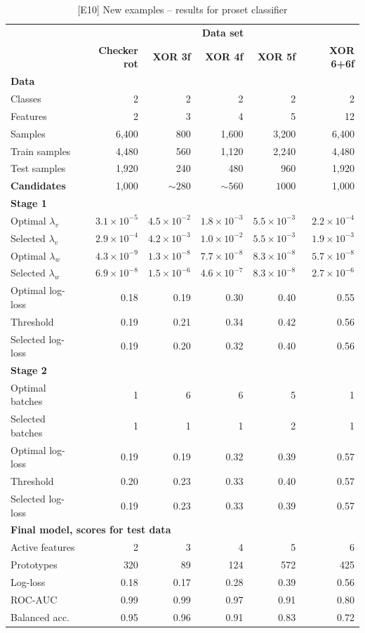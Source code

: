 \begin{table}
\caption{[E10] New examples -- results for proset classifier}
\label{tab_e10}
%
\begin{center}
\small
\begin{tabular}{|lrrrrr|}
\hline
&\multicolumn{5}{c|}{\textbf{\hrulefill\ Data set \hrulefill}}\\
&\textbf{Checker rot}&\textbf{XOR 3f}&\textbf{XOR 4f}&\textbf{XOR 5f}&\textbf{XOR 6+6f}\\
\multicolumn{6}{|l|}{\textbf{Data}}\\
Classes&2&2&2&2&2\\
Features&2&3&4&5&12\\
Samples&6,400&800&1,600&3,200&6,400\\
Train samples&4,480&560&1,120&2,240&4,480\\
Test samples&1,920&240&480&960&1,920\\
\textbf{Candidates}&1,000&$\sim280$&$\sim560$&$1000$&1,000\\
\multicolumn{6}{|l|}{\textbf{Stage 1}}\\
Optimal $\lambda_v$&$3.1\times10^{-5}$&$4.5\times10^{-2}$&$1.8\times10^{-3}$&$5.5\times10^{-3}$&$2.2\times10^{-4}$\\
Selected $\lambda_v$&$2.9\times10^{-4}$&$4.2\times10^{-3}$&$1.0\times10^{-2}$&$5.5\times10^{-3}$&$1.9\times10^{-3}$\\
Optimal $\lambda_w$&$4.3\times10^{-9}$&$1.3\times10^{-8}$&$7.7\times10^{-8}$&$8.3\times10^{-8}$&$5.7\times10^{-8}$\\
Selected $\lambda_w$&$6.9\times10^{-8}$&$1.5\times10^{-6}$&$4.6\times10^{-7}$&$8.3\times10^{-8}$&$2.7\times10^{-6}$\\
Optimal log-loss&0.18&0.19&0.30&0.40&0.55\\
Threshold&0.19&0.21&0.34&0.42&0.56\\
Selected log-loss&0.19&0.20&0.32&0.40&0.56\\
\multicolumn{6}{|l|}{\textbf{Stage 2}}\\
Optimal batches&1&6&6&5&1\\
Selected batches&1&1&1&2&1\\
Optimal log-loss&0.19&0.19&0.32&0.39&0.57\\
Threshold&0.20&0.23&0.33&0.40&0.57\\
Selected log-loss&0.19&0.23&0.33&0.39&0.57\\
\multicolumn{6}{|l|}{\textbf{Final model, scores for test data}}\\
Active features&2&3&4&5&6\\
Prototypes&320&89&124&572&425\\
Log-loss&0.18&0.17&0.28&0.39&0.56\\
ROC-AUC&0.99&0.99&0.97&0.91&0.80\\
Balanced acc.&0.95&0.96&0.91&0.83&0.72\\
\hline
\end{tabular}
\end{center}
\end{table}
